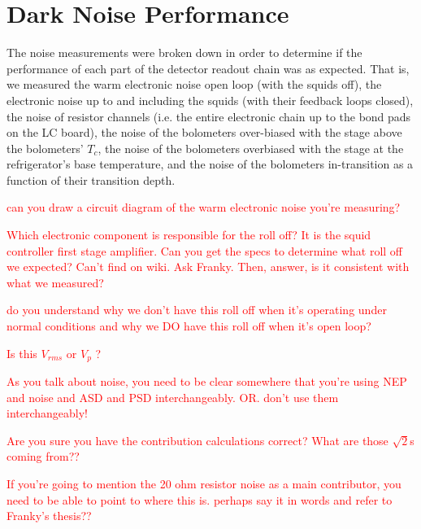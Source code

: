 


\section{Dark Noise Performance}
\label{sec:dark_noise}

The noise measurements were broken down in order to determine if the performance of each part of the detector readout chain was as expected. 
That is, we measured the warm electronic noise open loop (with the squids off), the electronic noise up to and including the squids (with their feedback loops closed), the noise of resistor channels (i.e. the entire electronic chain up to the bond pads on the \ac{LC} board), the noise of the bolometers over-biased with the stage above the bolometers' $T_{c}$, the noise of the bolometers overbiased with the stage at the refrigerator's base temperature, and the noise of the bolometers in-transition as a function of their transition depth. 



\textcolor{red}{can you draw a circuit diagram of the warm electronic noise you're measuring?}

\textcolor{red}{Which electronic component is responsible for the roll off? It is the squid controller first stage amplifier. Can you get the specs to determine what roll off we expected? Can't find on wiki. Ask Franky. Then, answer, is it consistent with what we measured?}

\textcolor{red}{do you understand why we don't have this roll off when it's operating under normal conditions and why we DO have this roll off when it's open loop?}

\textcolor{red}{Is this $V_{rms}$ or $V_{p}$ ?}

\textcolor{red}{As you talk about noise, you need to be clear somewhere that you're using NEP and noise and ASD and PSD interchangeably. OR. don't use them interchangeably!}

\textcolor{red}{Are you sure you have the contribution calculations correct? What are those $\sqrt{2}$s coming from??}

\textcolor{red}{If you're going to mention the 20 ohm resistor noise as a main contributor, you need to be able to point to where this is. perhaps say it in words and refer to Franky's thesis??}

